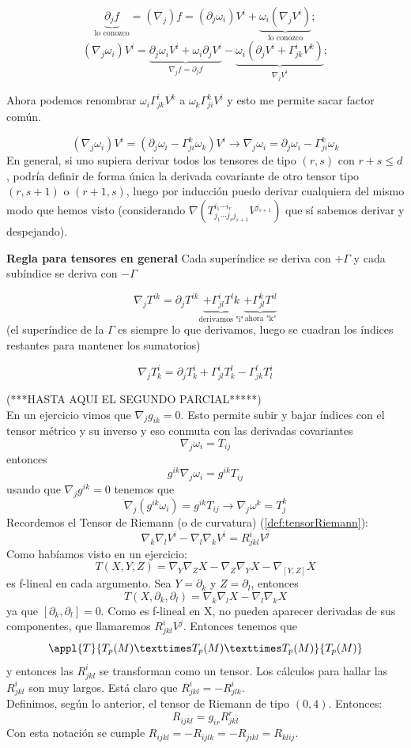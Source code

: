 \documentclass[palatino, bibnumbers]{apuntes}
\begin{document}
$$\underbrace{\partial_jf}_{\text{lo conozco}}=(\nabla_j)f=(\partial_j\omega_i)V^i+\underbrace{\omega_i(\nabla_jV^i)}_{\text{lo conozco}};$$ $$(\nabla_j\omega_i)V^i=\underbrace{\partial_j\omega_iV^i+\omega_i\partial_jV^i}_{\nabla_jf=\partial_jf}-\underbrace{\omega_i(\partial_jV^i+\Gamma^i_{jk}V^k)}_{\nabla_jV^i};$$
\begin{obs}Ahora podemos renombrar $\omega_i\Gamma^i_{jk}V^k$ a $\omega_k\Gamma^k_{ji}V^i$ y esto me permite sacar factor común.
\end{obs}
$$(\nabla_j\omega_i)V^i=(\partial_j\omega_i-\Gamma^k_{ji}\omega_k)V^i\longrightarrow\nabla_j\omega_i=\partial_j\omega_i-\Gamma^k_{ji}\omega_k$$ En general, si uno supiera derivar todos los tensores de tipo $(r,s)$ con $r+s\leq d$, podría definir de forma única la derivada covariante de otro tensor tipo $(r,s+1)$ o $(r+1,s)$, luego por inducción puedo derivar cualquiera del mismo modo que hemos visto (considerando $\nabla\left(T^{i_1\cdots i_r}_{j_1\cdots j_sj_{s+1}}V^{j_{s+1}}\right)$ que sí sabemos derivar y despejando).
\begin{prop}\textbf{Regla para tensores en general} Cada superíndice se deriva con $+\Gamma$ y cada subíndice se deriva con $-\Gamma$
\end{prop}
\begin{example}$$\nabla_jT^{ik}=\partial_jT^{ik}\underbrace{+\Gamma^i_{jl}T^lk}_{\text{derivamos "i"}}\underbrace{+\Gamma^k_{jl}T^{il}}_{\text{ahora "k"}}$$ (el superíndice de la $\Gamma$ es siempre lo que derivamos,  luego se cuadran los índices restantes para mantener los sumatorios)
\end{example}
\begin{example}$$\nabla_jT^i_k=\partial_jT^i_k+\Gamma^i_{jl}T^l_k-\Gamma^l_{jk}T^i_l$$
\end{example}

(***HASTA AQUI EL SEGUNDO PARCIAL*****)\\
En un ejercicio vimos que $\nabla_jg_{ik}=0$. Esto permite subir y bajar índices con el tensor métrico y su inverso y eso conmuta con las derivadas covariantes $$\nabla_j\omega_i=T_{ij}$$ entonces $$g^{ik}\nabla_{j}\omega_i=g^{ik}T_{ij}$$ usando que $\nabla_{j}g^{ik}=0$ tenemos que $$\nabla_{j}(g^{ik}\omega_i)=g^{ik}T_{ij}\rightarrow\nabla_{j}\omega^k=T^k_j$$
Recordemos el Tensor de Riemann (o de curvatura) (\ref{def:tensorRiemann}): $$\nabla_k\nabla_lV^i-\nabla_l\nabla_kV^i=R^i_{jkl}V^j$$ Como habíamos visto en un ejercicio: $$T(X,Y,Z)=\nabla_Y\nabla_ZX-\nabla_Z\nabla_YX-\nabla_{[Y,Z]}X$$ es f-lineal en cada argumento. Sea $Y=∂_k$ y $Z=∂_l$, entonces $$T(X,∂_k,∂_l)=\nabla_k\nabla_lX-\nabla_l\nabla_kX$$ ya que $[∂_k,∂_l]=0$. Como es f-lineal en X, no pueden aparecer derivadas de sus componentes, que llamaremos $R^i_{jkl}V^j$. Entonces tenemos que $$\appl{T}{T_p(M)×T_p(M)×T_p(M)}{T_p(M)}$$ y entonces las $R^i_{jkl}$ se transforman como un tensor. Los cálculos para hallar las $R^i_{jkl}$ son muy largos. Está claro que $R^i_{jkl}=-R^i_{jlk}$.\\
Definimos, según lo anterior, el tensor de Riemann de tipo $(0,4)$. Entonces: $$R_{ijkl}=g_{ir}R^r_{jkl}$$ Con esta notación se cumple $R_{ijkl}=-R_{ijlk}=-R_{jikl}=R_{klij}$.
\end{document}
